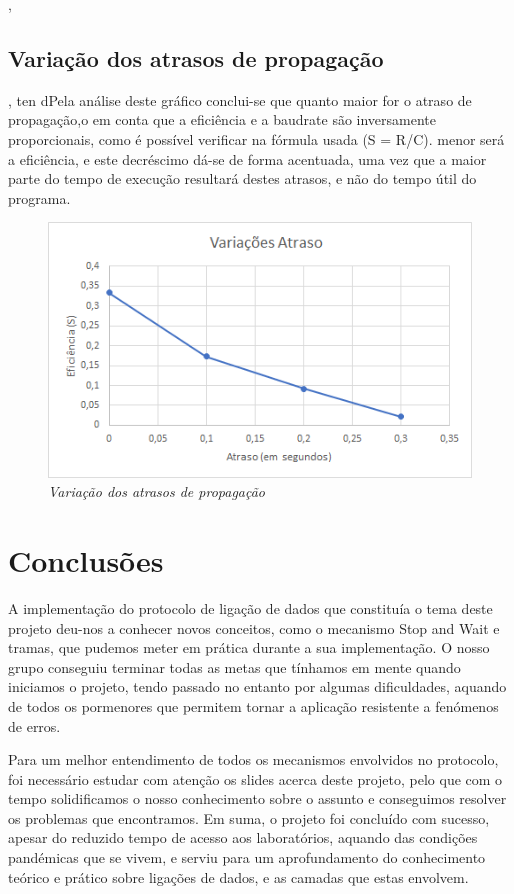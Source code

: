 \documentclass[article, a4paper, 11pt, oneside]{memoir}
\begin{document}
,\section{Variação dos atrasos de propagação}
, ten
dPela análise deste gráfico conclui-se que quanto maior for o atraso de propagação,o em conta que a eficiência e a baudrate são
inversamente proporcionais, como é possível verificar na fórmula usada (S = R/C). menor será a eficiência, e este decréscimo
dá-se de forma acentuada, uma vez que a maior parte do tempo de execução resultará destes atrasos, e não do tempo útil do programa.

\begin{figure}[h]
	\centering
\includegraphics[scale=0.4]{atraso.png}
\caption{\emph{Variação dos atrasos de propagação}}
\end{figure}

\chapter[Conclusões][Conclusões]{Conclusões} \label{\thechapter}

A implementação do protocolo de ligação de dados que constituía o tema deste projeto deu-nos a conhecer novos conceitos, como o mecanismo Stop and Wait e tramas, 
que pudemos meter em prática durante a sua implementação. O nosso grupo conseguiu terminar todas as metas que tínhamos em mente quando iniciamos o projeto,
 tendo passado no entanto por algumas dificuldades, aquando de todos os pormenores que permitem tornar a aplicação resistente a fenómenos de erros. 
 
 Para um melhor entendimento de todos os mecanismos envolvidos no protocolo, 
 foi necessário estudar com atenção os slides acerca deste projeto, pelo que com o tempo solidificamos o 
 nosso conhecimento sobre o assunto e conseguimos resolver os problemas que encontramos.
Em suma, o projeto foi concluído com sucesso, apesar do reduzido tempo de acesso aos laboratórios, aquando das condições pandémicas que se vivem, 
e serviu para um aprofundamento 
do conhecimento teórico e prático sobre ligações de dados, e as camadas que estas envolvem.
\end{document}

